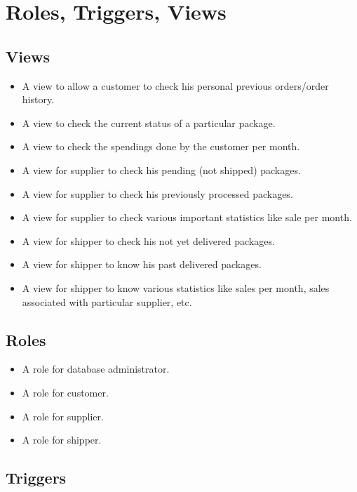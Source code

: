 \documentclass[a4paper,12pt]{article} %
\begin{document}
\section{Roles, Triggers, Views}
\subsection{Views}

\begin{itemize}
    \item A view to allow a customer to check his personal previous orders/order history.
    \item A view to check the current status of a particular package.
    \item A view to check the spendings done by the customer per month.
    \item A view for supplier to check his pending (not shipped) packages.
    \item A view for supplier to check his previously processed packages.
    \item A view for supplier to check various important statistics like sale per month. 
    \item A view for shipper to check his not yet delivered packages.
    \item A view for shipper to know his past delivered packages.
    \item A view for shipper to know various statistics like sales per month, sales associated with particular supplier, etc.
\end{itemize}


\subsection{Roles}
\begin{itemize}
    \item A role for database administrator.
    \item A role for customer.
    \item A role for supplier.
    \item A role for shipper.
\end{itemize}

\subsection{Triggers}
\end{document}
